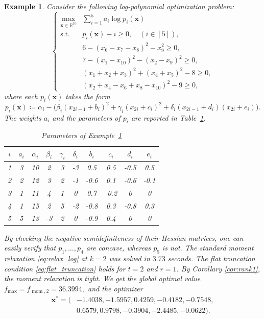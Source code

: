 \documentclass[pdflatex,sn-mathphys-num]{sn-jnl}%
\newcommand{\rd}[1]{{\color{red}#1}}
\newcommand{\vect}[1]{\boldsymbol{#1}}
\newcommand{\st}{\mathrm{s.t.}}
\theoremstyle{thmstyleone}%
\theoremstyle{thmstyletwo}%
\newtheorem{example}{Example}%
\theoremstyle{thmstylethree}%
\begin{document}
\begin{example}\label{ex:dim10}
	Consider the following log-polynomial optimization problem:
	\begin{equation*}
		\left\{\begin{array}{cl}
			\max\limits_{\vect{x} \in \mathbb{R}^{10}} & \sum\limits_{i=1}^{5} a_i \log p_i(\vect{x}) \\
			\st & p_i(\vect{x}) - i \geq 0, \quad (i \in [5]),\\
			& 6 - (x_6-x_7-x_8)^2 - x_9^2 \geq 0, \\
			& 7 - (x_1-x_{10})^2 - (x_2-x_9)^2 \geq 0,\\
			& (x_1 + x_2 + x_3)^2 + (x_4+x_5)^2 - 8 \geq 0,\\ 
			& (x_2+x_4-x_6+x_8-x_{10})^2 - 9 \geq 0,
		\end{array}\right.
	\end{equation*}
	where each $p_i(\vect{x})$ takes the form
	\[
	p_i(\vect{x})\coloneqq \alpha_i - \big(\beta_i(x_{2i-1} + b_i)^2 
	+ \gamma_i(x_{2i}+c_i)^2 + \delta_i(x_{2i-1}+d_i)(x_{2i}+e_i)\big).
	\]
	The weights $a_i$ and the parameters of $p_i$ are reported in
	Table~\ref{tab:dim10}.
	\begin{table}[htb]
		\centering
		\caption{Parameters of Example~\ref{ex:dim10}}
		\label{tab:dim10}
		\begin{tabular}{|c|c|c|c|c|c|c|c|c|c|}
			\hline
			$i$ & $a_i$ & $\alpha_i$ & $\beta_i$ & $\gamma_i$ & $\delta_i$  & $b_i$ & $c_i$ & $d_i$ & $e_i$\\ \hline
			1 & 3 & 10 & 2 & 3 & -3  & 0.5 & 0.5 & -0.5 & 0.5\\ \hline
			2 & 2 & 12 & 3 & 2 &  -1  & -0.6 & 0.1 & -0.6 & -0.1\\ \hline
			3 & 1 & 11 & 4 & 1 & 0  & 0.7 & -0.2 & 0 & 0 \\ \hline
			4 & 1 & 15 & 2 & 5 & -2 & -0.8 & 0.3 & -0.8 & 0.3 \\ \hline
			5 & 5 & 13 & -3 & 2 & 0  & -0.9 & 0.4 & 0 & 0 \\ \hline
		\end{tabular}
	\end{table}
	By checking the negative semidefiniteness of their Hessian matrices, 
	one can easily verify that $p_1, \ldots, p_4$ are concave, whereas $p_5$ is not.
	\rd{The standard moment relaxation \eqref{eq:relax_log} at $k=2$
	was solved in $3.73$ seconds.}
	The flat truncation condition \eqref{eq:flat_truncation} holds for
	$t=2$ and $r=1$.
	By Corollary \ref{cor:rank1}, 
	the moment relaxation is tight.
	We get the global optimal value $f_{\max} = f_{\operatorname{mom},2} =  36.3994,$
	and the optimizer
	\begin{equation*}
		\begin{array}{rl}
			\vect{x}^* = (&-1.4038, -1.5957, 0.4259, -0.4182, -0.7548, \\
			& 0.6579, 0.9798, -0.3904, -2.4485, -0.0622).
		\end{array}
	\end{equation*}
\end{example}
\end{document}
